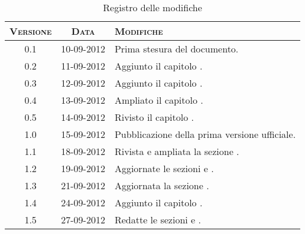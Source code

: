 \documentclass[10pt,a4paper,headinclude,footinclude,hidelinks]{scrreprt} %
\begin{document}
    \title{\rmfamily\normalfont{}}
    \author{}
    \date{\today}
    
    \maketitle
    
    \begin{abstract}
        \noindent Il documento presenta i risultati delle fasi di analisi e di progettazione dei nuovi criteri di classificazione.
    \end{abstract}
    
	\begin{table}[ht]
	\centering
	\begin{tabular}{|c|c|l|}
	\hline
	\textsc{Versione} & \textsc{Data} & \textsc{Modifiche} \\ \hline
	0.1 & 10-09-2012 & Prima stesura del documento. \\ \hline
	0.2 & 11-09-2012 & Aggiunto il capitolo \nameref{ch:stage:contenuti}. \\ \hline
	0.3 & 12-09-2012 & Aggiunto il capitolo \nameref{ch:stage:requisiti}. \\ \hline
	0.4 & 13-09-2012 & Ampliato il capitolo \nameref{ch:stage:requisiti}. \\ \hline
	0.5 & 14-09-2012 & Rivisto il capitolo \nameref{ch:stage:requisiti}. \\ \hline
	1.0 & 15-09-2012 & Pubblicazione della prima versione ufficiale. \\ \hline
	1.1 & 18-09-2012 & Rivista e ampliata la sezione \nameref{ch:stage:requisiti}. \\ \hline
	1.2 & 19-09-2012 & Aggiornate le sezioni \textit{\nameref{sec:stage:requisiti:entità}} e \textit{\nameref{sec:stage:requisiti:etichette}}. \\ \hline
	1.3 & 21-09-2012 & Aggiornata la sezione \textit{\nameref{sec:stage:requisiti:contenuti}}. \\ \hline
	1.4 & 24-09-2012 & Aggiunto il capitolo \nameref{ch:stage:design}.  \\ \hline
	1.5 & 27-09-2012 & Redatte le sezioni \textit{\nameref{sec:stage:design:entità}} e \textit{\nameref{sec:stage:design:etichette}}. \\ \hline	
	\end{tabular}
	\caption{Registro delle modifiche}
	\label{tab:stage:wp:workload}
	\end{table}
\end{document}
